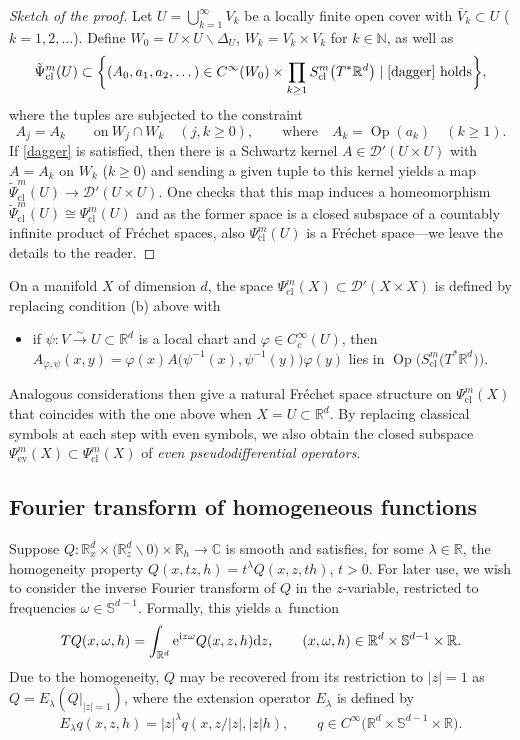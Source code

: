 \documentclass[pdftex]{sigma}
\numberwithin{equation}{section}
\theoremstyle{definition}
\newcommand{\R}{\mathbb{R}} %
\newcommand{\C}{\mathbb{C}} %
\newcommand{\ev}{\mathrm{ev}}
\newcommand{\1}{{\bf 1}}
\DeclareMathOperator{\Op}{Op}
\newcommand{\cl}{\mathrm{cl}}
\begin{document}
\begin{proof}[Sketch of the proof]
	Let $U=\bigcup_{k=1}^\infty V_k$ be a locally finite open cover with $\bar V_k\subset U$ ($k=1,2,\dots$). Define $W_0=U\times U\backslash \Delta_U$, $W_k=V_k\times V_k$ for $k\in \mathbb N$, as well as
	\[
		\tilde \Psi^m_\cl(U)\subset \bigg\{(A_0,a_1,a_2,\dots)\in C^\infty(W_0)\times \prod_{k\ge 1}S^m_\cl\bigl(T^*\R^d\bigr)\mid \eqref{dagger} \text{ holds}\bigg\},
	\]
	where the tuples are subjected to the constraint
	\begin{equation}\label{dagger}
		A_j=A_k \qquad\text{on}\  W_j\cap W_k \quad(j,k\ge 0),\qquad \text{where}\quad A_k = \Op(a_k)\quad(k\ge 1).
	\end{equation}
	If \eqref{dagger} is satisfied, then there is a Schwartz kernel $A\in \mathcal D'(U\times U)$ with $A=A_k$ on $W_k$ ($k\ge 0$)
	 and sending a given tuple to this kernel yields a map
$\tilde \Psi_\cl^m(U) \rightarrow \mathcal D'(U\times U)$.
	One checks that this map induces a homeomorphism $\tilde \Psi^m_\cl(U)\cong \Psi_\cl^m(U)$ and as the former space is a closed subspace of a countably infinite product of Fr{\'e}chet spaces, also $\Psi^m_\cl(U)$ is a Fr{\'e}chet space---we leave the details to the reader.
\end{proof}

On a manifold $X$ of dimension $d$, the space $\Psi^m_\cl(X)\subset \mathcal D'(X\times X)$ is defined by replacing condition (b) above with
\begin{itemize}\itemsep=0pt
	\item[(b$'$)] if $\psi\colon V\xrightarrow{\sim} U\subset \R^d$ is a local chart and $\varphi\in C_c^\infty(U)$, then $A_{\varphi,\psi}(x,y) = \varphi(x) A\bigl(\psi^{-1}(x),\allowbreak\psi^{-1}(y)\bigr) \varphi(y)$ lies in $\Op\bigl(S^m_\cl\bigl(T^*\R^d\bigr)\bigr)$.
\end{itemize}
Analogous considerations then give a natural Fr{\'e}chet space structure on $\Psi^m_\cl(X)$ that coincides with the one above when $X=U\subset \R^d$. By replacing classical symbols at each step with even symbols, we also obtain the closed subspace $\Psi^m_\ev(X)\subset\Psi^m_\cl(X)$ of {\it even pseudodifferential operators}.



\subsection{Fourier transform of homogeneous functions}
Suppose $Q\colon \R^d_x\times \bigl(\R^d_z\backslash 0\bigr) \times \R_h\rightarrow \C$ is smooth and satisfies, for some $\lambda\in \R$, the homogeneity property
$Q(x,tz,h)=t^\lambda Q(x,z,th)$, $ t>0$.
For later use, we wish to consider the inverse Fourier transform of $Q$ in the $z$-variable, restricted to frequencies $\omega \in \mathbb S^{d-1}$. Formally, this yields a~function
\[
	T Q(x,\omega,h)=\int_{\R^d} {\rm e}^{{\rm i}z\omega} Q(x,z,h) {\rm d}z,\qquad (x,\omega,h)\in \R^d\times \mathbb S^{d-1}\times \R.
\]
Due to the homogeneity, $Q$ may be recovered from its restriction to $|z|=1$ as $Q=E_\lambda(Q|_{|z|=1})$, where the extension operator $E_\lambda$ is defined by
\[
	E_\lambda q(x,z,h)=|z|^\lambda q(x,z/|z|,|z|h),\qquad q\in C^\infty\bigl(\R^d\times \mathbb S^{d-1}\times \R\bigr).
\]
\end{document}
